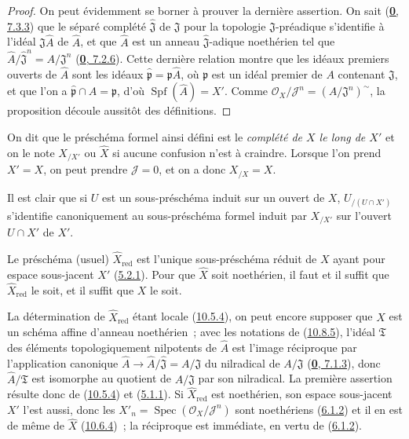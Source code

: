 \begin{proof}
On peut évidemment se borner à prouver la dernière assertion. On sait
(\hyperref[0.7.3.3-fr]{\textbf{0}, 7.3.3}) que le séparé complété
$\widehat{\mathfrak{J}}$ de $\mathfrak{J}$ pour la topologie
$\mathfrak{J}$-préadique s'identifie à l'idéal
$\mathfrak{J}\widehat A$ de $\widehat A$, et que $\widehat A$ est un anneau
$\widehat{\mathfrak{J}}$-adique noethérien tel que
$\widehat A/\widehat{\mathfrak{J}}^n=A/\mathfrak{J}^n$
(\hyperref[0.7.2.6-fr]{\textbf{0}, 7.2.6}). Cette dernière relation montre que les
idéaux premiers ouverts de $\widehat A$ sont les idéaux
$\widehat{\mathfrak p}=\mathfrak p\widehat A$, où $\mathfrak p$ est un
idéal premier de $A$ contenant $\mathfrak{J}$, et que l'on a
$\widehat{\mathfrak p}\cap A=\mathfrak p$, d'où
$\operatorname{Spf}(\widehat A)=X'$. Comme
$\mathscr{O}_X/\mathscr{J}^n=(A/\mathfrak{J}^n)^{\sim}$, la proposition
découle aussitôt des définitions.
\end{proof}

On dit que le préschéma formel ainsi défini est le
\emph{complété de $X$ le long de $X'$} et on le note $X_{/X'}$ ou
$\widehat X$ si aucune confusion n'est à craindre. Lorsque l'on prend
$X'=X$, on peut prendre $\mathscr{J}=0$, et on a donc $X_{/X}=X$.

Il est clair que si $U$ est un sous-préschéma induit sur un ouvert de $X$,
$U_{/(U\cap X')}$ s'identifie canoniquement au sous-préschéma formel induit
par $X_{/X'}$ sur l'ouvert $U\cap X'$ de $X'$.

\begin{corollary}[10.8.6]
\label{I.10.8.6-fr}
Le préschéma (usuel) $\widehat X_{\mathrm{red}}$ est l'unique
sous-préschéma réduit de $X$ ayant pour espace sous-jacent $X'$
\textup{(\hyperref[I.5.2.1-fr]{5.2.1})}. Pour que $\widehat X$ soit noethérien, il
faut et il suffit que $\widehat X_{\mathrm{red}}$ le soit, et il suffit que
$X$ le soit.
\end{corollary}


La détermination de $\widehat X_{\mathrm{red}}$ étant locale
(\hyperref[I.10.5.4-fr]{10.5.4}), on peut encore supposer que $X$ est un
schéma affine d'anneau noethérien~; avec les notations de
(\hyperref[I.10.8.5-fr]{10.8.5}), l'idéal $\mathfrak{T}$ des éléments
topologiquement nilpotents de $\widehat A$ est l'image réciproque par
l'application canonique
$\widehat A\to\widehat A/\widehat{\mathfrak{J}}=A/\mathfrak{J}$ du
nilradical de $A/\mathfrak{J}$
(\hyperref[0.7.1.3-fr]{\textbf{0}, 7.1.3}), donc $\widehat A/\mathfrak{T}$ est
isomorphe au quotient de $A/\mathfrak{J}$ par son nilradical. La première
assertion résulte donc de (\hyperref[I.10.5.4-fr]{10.5.4}) et
(\hyperref[I.5.1.1-fr]{5.1.1}). Si $\widehat X_{\mathrm{red}}$ est
noethérien, son espace sous-jacent $X'$ l'est aussi, donc les
$X'_n=\operatorname{Spec}(\mathscr{O}_X/\mathscr{J}^n)$ sont noethériens
(\hyperref[I.6.1.2-fr]{6.1.2}) et il en est de même de $\widehat X$
(\hyperref[I.10.6.4-fr]{10.6.4})~; la réciproque est immédiate, en vertu
de (\hyperref[I.6.1.2-fr]{6.1.2}).

